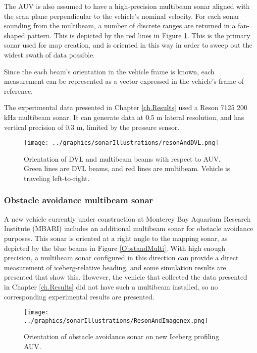 The AUV is also assumed to have a high-precision multibeam sonar aligned with the scan plane perpendicular to the vehicle's nominal velocity. For each sonar sounding from the multibeam, a number of discrete ranges are returned in a fan-shaped pattern. This is depicted by the red lines in Figure \ref{fig:DVLandMulti}. This is the primary sonar used for map creation, and is oriented in this way in order to sweep out the widest swath of data possible. 

Since the each beam's orientation in the vehicle frame is known, each measurement can be represented as a vector expressed in the vehicle's frame of reference.

The experimental data presented in Chapter \ref{ch.Results} used a Reson 7125 200 kHz multibeam sonar. It can generate data at 0.5 m lateral resolution, and has vertical precision of 0.3 m, limited by the pressure sensor.

\begin{figure}[htb]
   \centering
   \texttt{[image: ../graphics/sonarIllustrations/resonAndDVL.png]} %
   \caption{Orientation of DVL and multibeam beams with respect to AUV. Green lines are DVL beams, and red lines are multibeam. Vehicle is traveling left-to-right.}
   \label{fig:DVLandMulti}
\end{figure}

\subsubsection{Obstacle avoidance multibeam sonar}

A new vehicle currently under construction at Monterey Bay Aquarium Research Institute (MBARI) includes an additional multibeam sonar for obstacle avoidance purposes. This sonar is oriented at a right angle to the mapping sonar, as depicted by the blue beams in Figure \ref{ObstandMulti}. With high enough precision, a multibeam sonar configured in this direction can provide a direct measurement of iceberg-relative heading, and some simulation results are presented that show this. However, the vehicle that collected the data presented in Chapter \ref{ch.Results} did not have such a multibeam installed, so no corresponding experimental results are presented. 

\begin{figure}[htb]
   \centering
   \texttt{[image: ../graphics/sonarIllustrations/ResonAndImagenex.png]} %
   \caption{Orientation of obstacle avoidance sonar on new Iceberg profiling AUV. }
   \label{fig:ObstandMulti}
\end{figure}

